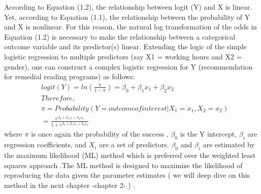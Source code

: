  According to Equation (1.2), the relationship between logit (Y) and X is linear. Yet, according to Equation (1.1), the relationship between the probability of Y and X is nonlinear. For this reason, the natural log transformation of the odds in Equation (1.2) is necessary to make the relationship between a categorical outcome variable and its predictor(s) linear.
 Extending the logic of the simple logistic regression to multiple predictors (say X1 = working hours and X2 = gender), one can construct a complex logistic regression for Y (recommendation for remedial reading programs) as follows:
 \begin{align*}
    &logit(Y) = ln\left(\frac{\pi}{1-\pi}\right) = {\beta_0 + \beta_1 x_1 + \beta_2 x_2 }\\
    &Therefore,\\
    &\pi = Probability (Y = outcome of interest | X_1 = x_1
, X_2 = x_2)\\  
    &= { \frac{e^{\beta_0 + \beta_1 x_1 + \beta_2 x_2}}{ {1+e^{\beta_0 + \beta_1 x_1 + \beta_2 x_2}}} }
\end{align*}
where $\pi$ is once again the probability of the success , $\beta_0$ is the Y intercept, $\beta _i$ are regression coefficients, and $X_i$ are a set of predictors. $\beta_0$ and $\beta _i$ are estimated by the maximum likelihood (ML) method  which is preferred over the weighted least squares approach .The ML method is designed to maximize the likelihood of reproducing the data given the parameter estimates ( we will deep dive on this method in the next chapter -chapter 2- ) .

